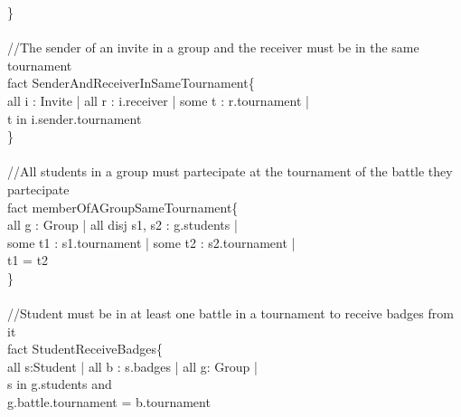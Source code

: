 \documentclass{article}
\begin{document}
{    \}\\
    \\
    \color{gray}
    //The sender of an invite in a group and the receiver must be in the same tournament\\
    \color{black}
    \color{blue} fact \color{black} SenderAndReceiverInSameTournament\{\\
	    \-\hspace{1cm} \color{blue} all \color{black} i : Invite | \color{blue} all \color{black} r : i.receiver |  \color{blue} some \color{black} t : r.tournament | \\
        \-\hspace{1cm} t \color{blue} in \color{black} i.sender.tournament\\
    \}\\
    \\
    \color{gray}
    //All students in a group must partecipate at the tournament of the battle they partecipate\\
    \color{black}
    \color{blue} fact \color{black} memberOfAGroupSameTournament\{\\
	    \-\hspace{1cm} \color{blue} all \color{black} g : Group | \color{blue} all disj \color{black} s1, s2 : g.students | \\
        \-\hspace{1cm} \color{blue} some \color{black} t1 : s1.tournament | \color{blue} some \color{black} t2 : s2.tournament | \\
        \-\hspace{1cm} t1 \color{blue} = \color{black} t2\\
    \}\\
    \\
    \color{gray}
    //Student must be in at least one battle in a tournament to receive badges from it\\
    \color{black}
    \color{blue} fact \color{black} StudentReceiveBadges\{\\
	    \-\hspace{1cm} \color{blue} all \color{black} s:Student | \color{blue} all \color{black} b : s.badges | \color{blue} all \color{black} g: Group |  \\
        \-\hspace{1cm} s \color{blue} in \color{black} g.students and    \\
        \-\hspace{1cm} g.battle.tournament \color{blue} = \color{black} b.tournament\\
}
\end{document}
